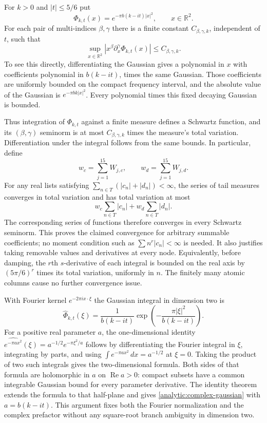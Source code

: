 \documentclass[11pt]{article}
\theoremstyle{remark}\newtheorem{remark}[theorem]{Remark}
\begin{document}
For $k>0$ and $|t|\le5/6$ put
\[
 \Phi_{k,t}(x)=e^{-\pi b(k-it)|x|^2},\qquad x\in\mathbb R^2.
\]
For each pair of multi-indices $\beta,\gamma$ there is a finite
constant $C_{\beta,\gamma,k}$, independent of $t$, such that
\begin{equation}\label{analytic:schwartz-uniform}
 \sup_{x\in\mathbb R^2}
  |x^\beta\partial_x^\gamma\Phi_{k,t}(x)|
 \le C_{\beta,\gamma,k}.
\end{equation}
To see this directly, differentiating the Gaussian gives a polynomial
in $x$ with coefficients polynomial in $b(k-it)$, times the same
Gaussian.  Those coefficients are uniformly bounded on the compact
frequency interval, and the absolute value of the Gaussian is
$e^{-\pi bk|x|^2}$.  Every polynomial times this fixed decaying Gaussian
is bounded.

Thus integration of $\Phi_{k,t}$ against a finite measure defines a
Schwartz function, and its $(\beta,\gamma)$ seminorm is at most
$C_{\beta,\gamma,k}$ times the measure's total variation.
Differentiation under the integral follows from the same bounds.
In particular, define
\[
 w_c=\sum_{j=1}^{15}W_{j,c},\qquad
 w_d=\sum_{j=1}^{15}W_{j,d}.
\]
For any real lists satisfying
$\sum_{n\in T}(|c_n|+|d_n|)<\infty$, the series of tail measures
converges in total variation and has total variation at most
\[
 w_c\sum_{n\in T}|c_n|+w_d\sum_{n\in T}|d_n|.
\]
The corresponding series of functions therefore converges in every
Schwartz seminorm.  This proves the claimed convergence for arbitrary
summable coefficients; no moment condition such as
$\sum n^r|c_n|<\infty$ is needed.  It also justifies taking removable
values and derivatives at every node.  Equivalently, before damping,
the $r$th $s$-derivative of each integral is bounded on the real axis
by $(5\pi/6)^r$ times its total variation, uniformly in $n$.
The finitely many atomic columns cause no further convergence issue.

With Fourier kernel $e^{-2\pi ix\cdot\xi}$ the Gaussian integral in
dimension two is
\begin{equation}\label{analytic:complex-gaussian}
 \widehat\Phi_{k,t}(\xi)
 =\frac1{b(k-it)}
   \exp\left(-\frac{\pi|\xi|^2}{b(k-it)}\right).
\end{equation}
For a positive real parameter $a$, the one-dimensional identity
$\widehat{e^{-\pi ax^2}}(\xi)=a^{-1/2}e^{-\pi\xi^2/a}$ follows by
differentiating the Fourier integral in $\xi$, integrating by parts,
and using $\int e^{-\pi ax^2}\,dx=a^{-1/2}$ at $\xi=0$.
Taking the product of two such integrals gives the two-dimensional
formula.  Both sides of that formula are holomorphic in $a$ on
$\operatorname{Re}a>0$: compact subsets have a common integrable
Gaussian bound for every parameter derivative.  The identity theorem
extends the formula to that half-plane and gives
\eqref{analytic:complex-gaussian} with $a=b(k-it)$.
This argument fixes both the Fourier normalization and the complex
prefactor without any square-root branch ambiguity in dimension two.
\end{document}
